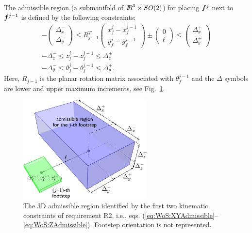 \begin{itemize}
\smallskip
The admissible region (a submanifold of ${I\!\!R}^3 \times SO(2)$) for placing ${\bm{f}}^{j}$ next to ${\bm{f}}^{j-1}$ is defined by the following constraints:
\begin{gather} 
-\begin{pmatrix}
\Delta_x^- \\[5pt] \Delta_y^-
\end{pmatrix}
\le
R_{j-1}^T \begin{pmatrix}
x_f^j - x_f^{j-1} \\[5pt] y_f^j - y_f^{j-1}
\end{pmatrix}
\pm \begin{pmatrix}
0 \\ \ell
\end{pmatrix}
\le
\begin{pmatrix}
\Delta_x^+ \\[5pt] \Delta_y^+
\end{pmatrix} \label{eq:WoS:XYAdmissible}\\[5pt]
-\Delta_z^- \le z_f^j - z_f^{j-1} \le \Delta_z^+
\label{eq:WoS:ZAdmissible}\\[5pt]
-\Delta_\theta^- \le \theta_f^j - \theta_f^{j-1} \le \Delta_\theta^+. \label{eq:WoS:ThetaAdmissible}
\end{gather}
Here, $R_{j-1}$ is the planar rotation matrix associated with $\theta_f^{j-1}$ and the $\Delta$ symbols are lower and upper maximum increments, see Fig.~\ref{fig:WoS:KinCon}.

\begin{figure}
\centering
\includegraphics[width=0.6\textwidth]{figures/kinematic_limits.png}
\caption{The 3D admissible region identified by the first two kinematic constraints of requirement R2, i.e., eqs. (\ref{eq:WoS:XYAdmissible}-- \ref{eq:WoS:ZAdmissible}). Footstep orientation is not represented.}
\label{fig:WoS:KinCon}
\end{figure}


\end{itemize}
